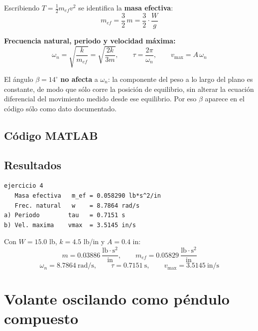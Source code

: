 \documentclass[12pt,letterpaper]{article}
\begin{document}
Escribiendo $T = \tfrac{1}{2}m_{ef}v^{2}$ se identifica la \textbf{masa efectiva}:
\begin{equation}
\boxed{\;m_{ef} = \frac{3}{2}\,m = \frac{3}{2}\cdot\frac{W}{g}\;}
\end{equation}

\textbf{Frecuencia natural, periodo y velocidad máxima:}
\begin{equation}
\omega_n = \sqrt{\frac{k}{m_{ef}}} = \sqrt{\frac{2k}{3m}},
\qquad \tau = \frac{2\pi}{\omega_n},
\qquad v_{\max} = A\,\omega_n
\end{equation}

\noindent El ángulo $\beta = 14^{\circ}$ \textbf{no afecta} a $\omega_n$: la componente
del peso a lo largo del plano es constante, de modo que sólo corre la posición de
equilibrio, sin alterar la ecuación diferencial del movimiento medido desde ese
equilibrio. Por eso $\beta$ aparece en el código sólo como dato documentado.

\subsection{Código MATLAB}


\subsection{Resultados}
\begin{lstlisting}[style=consola]
ejercicio 4
   Masa efectiva   m_ef = 0.058290 lb*s^2/in
   Frec. natural   w    = 8.7864 rad/s
a) Periodo        tau   = 0.7151 s
b) Vel. maxima    vmax  = 3.5145 in/s
\end{lstlisting}

\noindent Con $W = 15.0$ lb, $k = 4.5$ lb/in y $A = 0.4$ in:
\[
m = 0.03886\ \frac{\text{lb}\cdot\text{s}^2}{\text{in}}, \qquad
m_{ef} = 0.05829\ \frac{\text{lb}\cdot\text{s}^2}{\text{in}}
\]
\[
\omega_n = 8.7864\ \text{rad/s}, \qquad
\tau = 0.7151\ \text{s}, \qquad
v_{\max} = 3.5145\ \text{in/s}
\]

\newpage
\section{Volante oscilando como péndulo compuesto}
\end{document}
